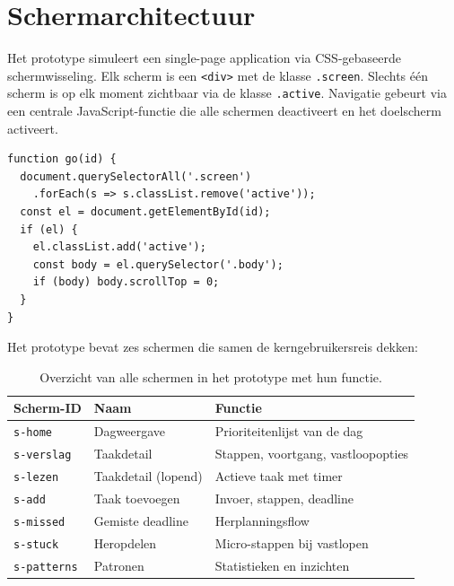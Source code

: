 \section{Schermarchitectuur}

Het prototype simuleert een single-page application via CSS-gebaseerde
schermwisseling. Elk scherm is een \texttt{<div>} met de klasse
\texttt{.screen}. Slechts één scherm is op elk moment zichtbaar via de klasse
\texttt{.active}. Navigatie gebeurt via een centrale JavaScript-functie die
alle schermen deactiveert en het doelscherm activeert.

\begin{listing}[ht]
\caption[Navigatiefunctie]{De centrale navigatiefunctie die schermwisseling
beheert in het prototype.}
\label{lst:navigatie}
\begin{verbatim}
function go(id) {
  document.querySelectorAll('.screen')
    .forEach(s => s.classList.remove('active'));
  const el = document.getElementById(id);
  if (el) {
    el.classList.add('active');
    const body = el.querySelector('.body');
    if (body) body.scrollTop = 0;
  }
}
\end{verbatim}
\end{listing}

Het prototype bevat zes schermen die samen de kerngebruikersreis dekken:

\begin{table}[h]
\centering
\begin{tabular}{lll}
\hline
\textbf{Scherm-ID} & \textbf{Naam} & \textbf{Functie} \\
\hline
\texttt{s-home}     & Dagweergave          & Prioriteitenlijst van de dag \\
\texttt{s-verslag}  & Taakdetail           & Stappen, voortgang, vastloopopties \\
\texttt{s-lezen}    & Taakdetail (lopend)  & Actieve taak met timer \\
\texttt{s-add}      & Taak toevoegen       & Invoer, stappen, deadline \\
\texttt{s-missed}   & Gemiste deadline     & Herplanningsflow \\
\texttt{s-stuck}    & Heropdelen           & Micro-stappen bij vastlopen \\
\texttt{s-patterns} & Patronen             & Statistieken en inzichten \\
\hline
\end{tabular}
\caption[Schermoverzicht van het prototype]{Overzicht van alle schermen in het
prototype met hun functie.}
\label{tab:schermen}
\end{table}

